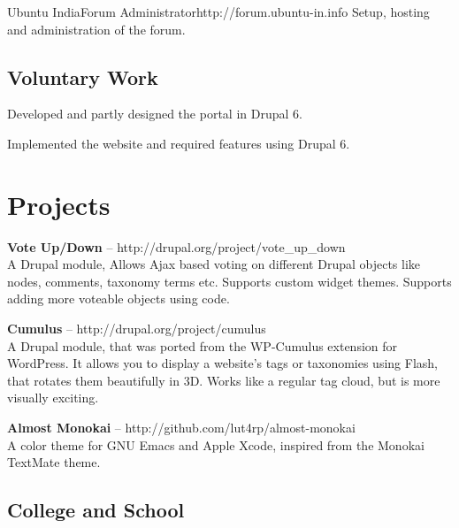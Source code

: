\documentclass[11pt,a4paper]{moderncv}
\begin{document}
{Ubuntu India}{Forum Administrator}{}{http://forum.ubuntu-in.info}
{Setup, hosting and administration of the forum.}

\subsection{Voluntary Work}

{Developed and partly designed the portal in Drupal 6.}

{Implemented the website and required features using Drupal 6.}



\pagebreak
\section{Projects}

\cvlistitem
{\textbf{Vote Up/Down} -- {\small http://drupal.org/project/vote\_up\_down}
\\A Drupal module, Allows Ajax based voting on different Drupal objects like nodes, comments, taxonomy terms etc. Supports custom widget themes. Supports adding more voteable objects using code.\\
}

\cvlistitem
{\textbf{Cumulus} -- {\small http://drupal.org/project/cumulus}
\\A Drupal module, that was ported from the WP-Cumulus extension for WordPress. It allows you to display a website's tags or taxonomies using Flash, that rotates them beautifully in 3D. Works like a regular tag cloud, but is more visually exciting.\\
}

\cvlistitem
{\textbf{Almost Monokai} -- {\small http://github.com/lut4rp/almost-monokai}
\\A color theme for GNU Emacs and Apple Xcode, inspired from the Monokai TextMate theme.\\
}

\subsection{College and School}
\end{document}
